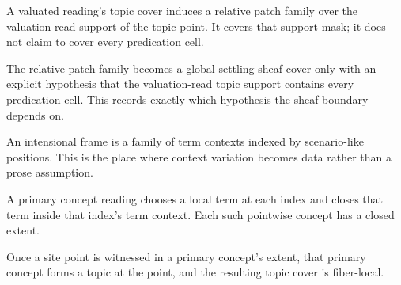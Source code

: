 \begin{proposition}\label{thm:claim-valuated-reading-topic-patch-family}\leanok{}
A valuated reading's topic cover induces a relative patch family over the
valuation-read support of the topic point.  It covers that support mask; it does
not claim to cover every predication cell.
\end{proposition}

\begin{proposition}\label{thm:claim-valuated-reading-topic-sheaf-cover}\leanok{}
The relative patch family becomes a global settling sheaf cover only with an
explicit hypothesis that the valuation-read topic support contains every
predication cell.  This records exactly which hypothesis the sheaf boundary
depends on.
\end{proposition}

\begin{proposition}\label{thm:claim-intensional-frame}\leanok{}
An intensional frame is a family of term contexts indexed by scenario-like
positions.  This is the place where context variation becomes data rather than
a prose assumption.
\end{proposition}

\begin{theorem}\label{thm:claim-primary-concept-closed}\leanok{}
A primary concept reading chooses a local term at each index and closes that
term inside that index's term context.  Each such pointwise concept has a closed
extent.
\end{theorem}

\begin{theorem}\label{thm:claim-primary-topic-cover}\leanok{}
Once a site point is witnessed in a primary concept's extent, that primary
concept forms a topic at the point, and the resulting topic cover is fiber-local.
\end{theorem}

